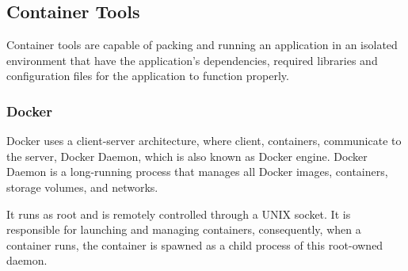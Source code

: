 \documentclass[a4paper,num-refs]{oup-contemporary}
\begin{document}

\subsection{Container Tools}

Container tools are capable of packing and running an application in an isolated environment that have
the application's dependencies,
required libraries and configuration files for the
application to function properly.

\subsubsection{Docker}

Docker uses a client-server architecture, where client, containers, communicate to
the server, Docker Daemon, which is also known as Docker engine.
Docker Daemon is a long-running process that manages all Docker images, containers, storage volumes, and networks.

It runs as root and is remotely controlled through a
UNIX socket. It is responsible for launching and managing containers,
consequently, when a container runs, the container is spawned as a
child process of this root-owned daemon.
\end{document}
